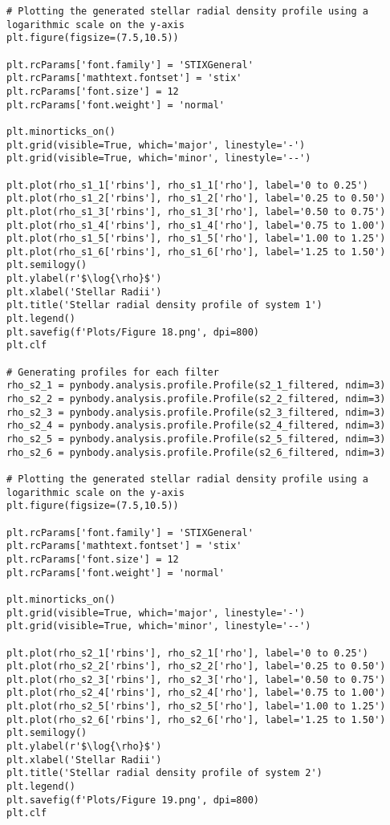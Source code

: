 \documentclass[12pt, a4paper]{article}
\begin{document}
\begin{lstlisting}[language=iPython]
# Plotting the generated stellar radial density profile using a logarithmic scale on the y-axis
plt.figure(figsize=(7.5,10.5))
  
plt.rcParams['font.family'] = 'STIXGeneral'
plt.rcParams['mathtext.fontset'] = 'stix'
plt.rcParams['font.size'] = 12
plt.rcParams['font.weight'] = 'normal'
  
plt.minorticks_on()
plt.grid(visible=True, which='major', linestyle='-')
plt.grid(visible=True, which='minor', linestyle='--')
  
plt.plot(rho_s1_1['rbins'], rho_s1_1['rho'], label='0 to 0.25') 
plt.plot(rho_s1_2['rbins'], rho_s1_2['rho'], label='0.25 to 0.50')
plt.plot(rho_s1_3['rbins'], rho_s1_3['rho'], label='0.50 to 0.75')
plt.plot(rho_s1_4['rbins'], rho_s1_4['rho'], label='0.75 to 1.00')
plt.plot(rho_s1_5['rbins'], rho_s1_5['rho'], label='1.00 to 1.25')
plt.plot(rho_s1_6['rbins'], rho_s1_6['rho'], label='1.25 to 1.50')
plt.semilogy()
plt.ylabel(r'$\log{\rho}$')
plt.xlabel('Stellar Radii')
plt.title('Stellar radial density profile of system 1')
plt.legend()
plt.savefig(f'Plots/Figure 18.png', dpi=800)
plt.clf
  
# Generating profiles for each filter
rho_s2_1 = pynbody.analysis.profile.Profile(s2_1_filtered, ndim=3)
rho_s2_2 = pynbody.analysis.profile.Profile(s2_2_filtered, ndim=3)
rho_s2_3 = pynbody.analysis.profile.Profile(s2_3_filtered, ndim=3)
rho_s2_4 = pynbody.analysis.profile.Profile(s2_4_filtered, ndim=3)
rho_s2_5 = pynbody.analysis.profile.Profile(s2_5_filtered, ndim=3)
rho_s2_6 = pynbody.analysis.profile.Profile(s2_6_filtered, ndim=3)
  
# Plotting the generated stellar radial density profile using a logarithmic scale on the y-axis
plt.figure(figsize=(7.5,10.5))
  
plt.rcParams['font.family'] = 'STIXGeneral'
plt.rcParams['mathtext.fontset'] = 'stix'
plt.rcParams['font.size'] = 12
plt.rcParams['font.weight'] = 'normal'
  
plt.minorticks_on()
plt.grid(visible=True, which='major', linestyle='-')
plt.grid(visible=True, which='minor', linestyle='--')
  
plt.plot(rho_s2_1['rbins'], rho_s2_1['rho'], label='0 to 0.25') 
plt.plot(rho_s2_2['rbins'], rho_s2_2['rho'], label='0.25 to 0.50')
plt.plot(rho_s2_3['rbins'], rho_s2_3['rho'], label='0.50 to 0.75')
plt.plot(rho_s2_4['rbins'], rho_s2_4['rho'], label='0.75 to 1.00')
plt.plot(rho_s2_5['rbins'], rho_s2_5['rho'], label='1.00 to 1.25')
plt.plot(rho_s2_6['rbins'], rho_s2_6['rho'], label='1.25 to 1.50')
plt.semilogy()
plt.ylabel(r'$\log{\rho}$')
plt.xlabel('Stellar Radii')
plt.title('Stellar radial density profile of system 2')
plt.legend()
plt.savefig(f'Plots/Figure 19.png', dpi=800)
plt.clf
  

\end{lstlisting}
\end{document}
